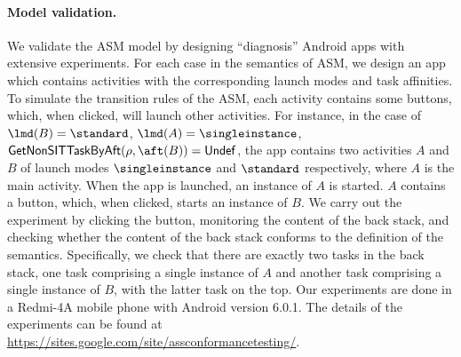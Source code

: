 {%

\paragraph{Model validation.}
We validate the ASM model by designing ``diagnosis'' Android apps with extensive experiments. For each case in  the semantics of ASM, we design an  app  which contains activities with the corresponding launch modes and task affinities. To simulate the transition rules of the ASM, each activity contains some buttons, which, when clicked, will launch other activities. For instance, in the case of $\lmd(B) = \standard$, $\lmd(A) = \singleinstance$,  ${\sf GetNonSITTaskByAft}(\rho, \aft(B))={\sf Undef}$, the app contains two activities $A$ and $B$ of launch modes $\singleinstance$ and $\standard$ respectively, where $A$ is the main activity. When the app is launched, an instance of $A$ is started.  $A$ contains a button, which, when clicked, starts an instance of $B$. We carry out the experiment by clicking the button, monitoring the content of the back stack, and checking whether the content of the back stack conforms to the definition of the semantics. Specifically, we check that there are exactly two tasks in the back stack, one task comprising a single instance of $A$ and another task comprising a single instance of $B$, with the latter task on the top. Our experiments are done in a Redmi-4A mobile phone with Android version 6.0.1.
The details of the experiments can be found at \url{https://sites.google.com/site/assconformancetesting/}.


%


}
